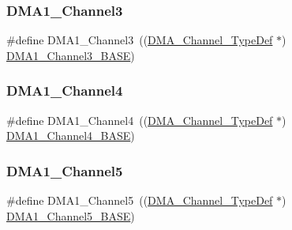 \subsubsection{\texorpdfstring{DMA1\_Channel3}{DMA1\_Channel3}}
{\footnotesize\ttfamily \#define D\+M\+A1\+\_\+\+Channel3~((\mbox{\hyperlink{struct_d_m_a___channel___type_def}{D\+M\+A\+\_\+\+Channel\+\_\+\+Type\+Def}} $\ast$) \mbox{\hyperlink{group___peripheral__memory__map_ga70b3d9f36ca9ce95b4e421c11154fe5d}{D\+M\+A1\+\_\+\+Channel3\+\_\+\+B\+A\+SE}})}

\mbox{\label{group___peripheral__declaration_gad2c42743316bf64da557130061b1f56a}} 
\subsubsection{\texorpdfstring{DMA1\_Channel4}{DMA1\_Channel4}}
{\footnotesize\ttfamily \#define D\+M\+A1\+\_\+\+Channel4~((\mbox{\hyperlink{struct_d_m_a___channel___type_def}{D\+M\+A\+\_\+\+Channel\+\_\+\+Type\+Def}} $\ast$) \mbox{\hyperlink{group___peripheral__memory__map_ga1adc93cd0baf0897202c71110e045692}{D\+M\+A1\+\_\+\+Channel4\+\_\+\+B\+A\+SE}})}

\mbox{\label{group___peripheral__declaration_ga06ff98ddef3c962795d2e2444004abff}} 
\subsubsection{\texorpdfstring{DMA1\_Channel5}{DMA1\_Channel5}}
{\footnotesize\ttfamily \#define D\+M\+A1\+\_\+\+Channel5~((\mbox{\hyperlink{struct_d_m_a___channel___type_def}{D\+M\+A\+\_\+\+Channel\+\_\+\+Type\+Def}} $\ast$) \mbox{\hyperlink{group___peripheral__memory__map_gac041a71cd6c1973964f847a68aa14478}{D\+M\+A1\+\_\+\+Channel5\+\_\+\+B\+A\+SE}})}

\mbox{\label{group___peripheral__declaration_gac013c4376e4797831b5ddd2a09519df8}} 
